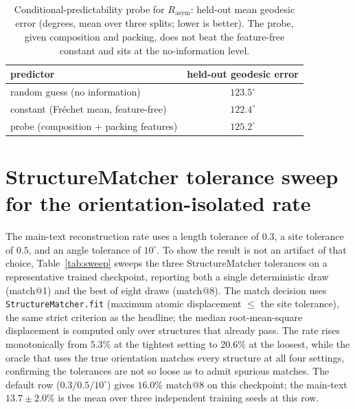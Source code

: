 \documentclass[11pt]{article}
\begin{document}
\begin{table}[h]
\centering
\caption{Conditional-predictability probe for $R_{\text{asym}}$: held-out mean
geodesic error (degrees, mean over three splits; lower is better). The probe,
given composition and packing, does not beat the feature-free constant and sits
at the no-information level.}
\label{tab:probe}
\begin{tabular}{lc}
\toprule
predictor & held-out geodesic error \\
\midrule
random guess (no information)        & $123.5^\circ$ \\
constant (Fr\'echet mean, feature-free) & $122.4^\circ$ \\
probe (composition + packing features)  & $125.2^\circ$ \\
\bottomrule
\end{tabular}
\end{table}

\section{StructureMatcher tolerance sweep for the orientation-isolated rate}

The main-text reconstruction rate uses a length tolerance of $0.3$, a site
tolerance of $0.5$, and an angle tolerance of $10^\circ$. To show the result is
not an artifact of that choice, Table~\ref{tab:sweep} sweeps the three
StructureMatcher tolerances on a representative trained checkpoint, reporting both
a single deterministic draw (match@1) and the best of eight draws (match@8). The
match decision uses \texttt{StructureMatcher.fit} (maximum atomic displacement
$\leq$ the site tolerance), the same strict criterion as the headline; the median
root-mean-square displacement is computed only over structures that already pass.
The rate rises monotonically from $5.3\%$ at the tightest setting to $20.6\%$ at
the loosest, while the oracle that uses the true orientation matches every
structure at all four settings, confirming the tolerances are not so loose as to
admit spurious matches. The default row ($0.3/0.5/10^\circ$) gives $16.0\%$
match@8 on this checkpoint; the main-text $13.7\pm2.0\%$ is the mean over three
independent training seeds at this row.
\end{document}

